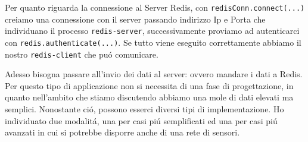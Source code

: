 Per quanto riguarda la connessione al Server Redis,  con \texttt{redisConn.connect(...)} creiamo una connessione con il server
passando indirizzo Ip e Porta che individuano il processo \texttt{redis-server}, successivamente proviamo ad autenticarci con
\texttt{redis.authenticate(...)}. Se tutto viene eseguito correttamente abbiamo il nostro \texttt{redis-client} che puó
comunicare.

Adesso bisogna passare all'invio dei dati al server: ovvero mandare i dati a Redis.
Per questo tipo di applicazione non si necessita di una fase di progettazione, in quanto
nell'ambito che stiamo discutendo abbiamo una mole di dati elevati ma semplici.
Nonostante ció, possono esserci diversi tipi di implementazione.
Ho individuato due modalitá, una per casi piú semplificati ed una per casi piú avanzati in cui si potrebbe disporre
anche di una rete di sensori.


